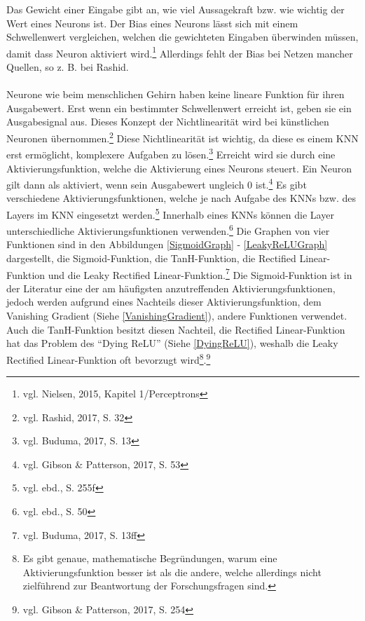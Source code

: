 \documentclass[
	a4paper,
	12pt,
	ngerman,
	oneside
]{scrreprt}											%
\begin{document}
			Das Gewicht einer Eingabe gibt an, wie viel Aussagekraft bzw. wie wichtig der Wert eines Neurons ist. Der Bias eines Neurons lässt sich mit einem Schwellenwert vergleichen, welchen die gewichteten Eingaben überwinden müssen, damit dass Neuron aktiviert wird.\footnote{vgl. Nielsen, 2015, Kapitel 1/Perceptrons} Allerdings fehlt der Bias bei Netzen mancher Quellen, so z. B. bei Rashid.
			\ \\
			\ \\
			Neurone wie beim menschlichen Gehirn haben keine lineare Funktion für ihren Ausgabewert. Erst wenn ein bestimmter Schwellenwert erreicht ist, geben sie ein Ausgabesignal aus. Dieses Konzept der Nichtlinearität wird bei künstlichen Neuronen übernommen.\footnote{vgl. Rashid, 2017, S. 32} Diese Nichtlinearität ist wichtig, da diese es einem KNN erst ermöglicht, komplexere Aufgaben zu lösen.\footnote{vgl. Buduma, 2017, S. 13} Erreicht wird sie durch eine Aktivierungsfunktion, welche die Aktivierung eines Neurons steuert. Ein Neuron gilt dann als aktiviert, wenn sein Ausgabewert ungleich 0 ist.\footnote{vgl. Gibson \& Patterson, 2017, S. 53} Es gibt verschiedene Aktivierungsfunktionen, welche je nach Aufgabe des KNNs bzw. des Layers im KNN eingesetzt werden.\footnote{vgl. ebd., S. 255f} Innerhalb eines KNNs können die Layer unterschiedliche Aktivierungsfunktionen verwenden.\footnote{vgl. ebd., S. 50} Die Graphen von vier Funktionen sind in den Abbildungen \ref{SigmoidGraph} - \ref{LeakyReLUGraph} dargestellt, die Sigmoid-Funktion, die TanH-Funktion, die Rectified Linear-Funktion und die Leaky Rectified Linear-Funktion.\footnote{vgl. Buduma, 2017, S. 13ff} Die Sigmoid-Funktion ist in der Literatur eine der am häufigsten anzutreffenden Aktivierungsfunktionen, jedoch werden aufgrund eines Nachteils dieser Aktivierungsfunktion, dem Vanishing Gradient (Siehe \ref{VanishingGradient}), andere Funktionen verwendet. Auch die TanH-Funktion besitzt diesen Nachteil, die Rectified Linear-Funktion hat das Problem des "`Dying ReLU"' (Siehe \ref{DyingReLU}), weshalb die Leaky Rectified Linear-Funktion oft bevorzugt wird\footnote{Es gibt genaue, mathematische Begründungen, warum eine Aktivierungsfunktion besser ist als die andere, welche allerdings nicht zielführend zur Beantwortung der Forschungsfragen sind.}.\footnote{vgl. Gibson \& Patterson, 2017, S. 254}
		
		
\end{document}
